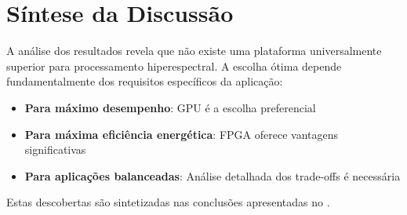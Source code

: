 \section{Síntese da Discussão}\label{sec:sintese_discussao}

A análise dos resultados revela que não existe uma plataforma universalmente superior para processamento hiperespectral. A escolha ótima depende fundamentalmente dos requisitos específicos da aplicação:

\begin{itemize}
    \item \textbf{Para máximo desempenho}: GPU é a escolha preferencial
    \item \textbf{Para máxima eficiência energética}: FPGA oferece vantagens significativas
    \item \textbf{Para aplicações balanceadas}: Análise detalhada dos trade-offs é necessária
\end{itemize}

Estas descobertas são sintetizadas nas conclusões apresentadas no . 